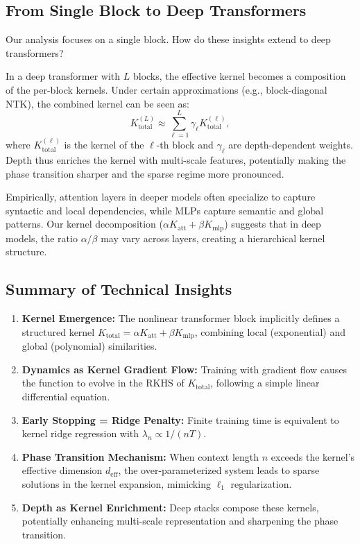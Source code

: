 	\subsection{From Single Block to Deep Transformers}
	\label{subsec:deep_transformers}
	
	Our analysis focuses on a single block. How do these insights extend to deep transformers?
	
	\begin{remark}
		In a deep transformer with $L$ blocks, the effective kernel becomes a composition of the per-block kernels. Under certain approximations (e.g., block-diagonal NTK), the combined kernel can be seen as:
		\[
		K_{\text{total}}^{(L)} \approx \sum_{\ell=1}^L \gamma_\ell K_{\text{total}}^{(\ell)},
		\]
		where $K_{\text{total}}^{(\ell)}$ is the kernel of the $\ell$-th block and $\gamma_\ell$ are depth-dependent weights. Depth thus enriches the kernel with multi-scale features, potentially making the phase transition sharper and the sparse regime more pronounced.
	\end{remark}
	
	\begin{remark}
		Empirically, attention layers in deeper models often specialize to capture syntactic and local dependencies, while MLPs capture semantic and global patterns. Our kernel decomposition ($\alpha K_{\text{att}} + \beta K_{\text{mlp}}$) suggests that in deep models, the ratio $\alpha/\beta$ may vary across layers, creating a hierarchical kernel structure.
	\end{remark}
	
	\subsection{Summary of Technical Insights}
	\label{subsec:summary_tech}
	
	\begin{enumerate}
		\item \textbf{Kernel Emergence:} The nonlinear transformer block implicitly defines a structured kernel $K_{\text{total}} = \alpha K_{\text{att}} + \beta K_{\text{mlp}}$, combining local (exponential) and global (polynomial) similarities.
		\item \textbf{Dynamics as Kernel Gradient Flow:} Training with gradient flow causes the function to evolve in the RKHS of $K_{\text{total}}$, following a simple linear differential equation.
		\item \textbf{Early Stopping = Ridge Penalty:} Finite training time is equivalent to kernel ridge regression with $\lambda_n \propto 1/(nT)$.
		\item \textbf{Phase Transition Mechanism:} When context length $n$ exceeds the kernel's effective dimension $d_{\text{eff}}$, the over-parameterized system leads to sparse solutions in the kernel expansion, mimicking $\ell_1$ regularization.
		\item \textbf{Depth as Kernel Enrichment:} Deep stacks compose these kernels, potentially enhancing multi-scale representation and sharpening the phase transition.
	\end{enumerate}
	
